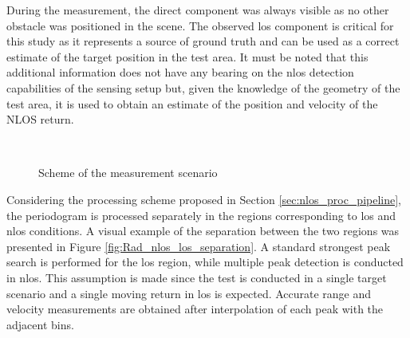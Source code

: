 During the measurement, the direct component was always visible as no other obstacle was positioned in the scene. 
The observed \gls{los} component is critical for this study as it represents a source of ground truth and can be used as a correct estimate of the target position in the test area.
It must be noted that this additional information does not have any bearing on the \gls{nlos} detection capabilities of the sensing setup but, given 
the knowledge of the geometry of the test area, it is used to obtain an estimate of the position and velocity of the NLOS return. 

\begin{figure}[t]
	\centering
	
	\\
	\caption{\small Scheme of the measurement scenario}
	\label{fig:Test1_base_and_top_view}
\end{figure}

Considering the processing scheme proposed in Section \ref{sec:nlos_proc_pipeline}, the periodogram is processed separately in the regions corresponding to \gls{los} and \gls{nlos} conditions. A visual example of the separation between the two regions was presented in Figure \ref{fig:Rad_nlos_los_separation}.
A standard strongest peak search is performed for the \gls{los} region, while multiple peak detection is conducted in \gls{nlos}. This assumption is made since the test is conducted in a single target scenario and a single moving return in \gls{los} is expected.
Accurate range and velocity measurements are obtained after interpolation of each peak with the adjacent bins.

